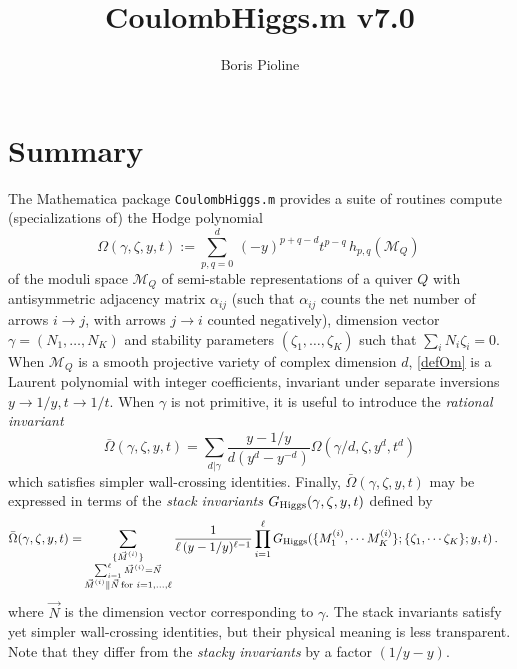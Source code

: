 \documentclass[12pt]{JHEP3}
\title{CoulombHiggs.m v7.0}
\author{Boris Pioline}
\newcommand{\be}{\begin{equation}}
\newcommand{\ee}{\end{equation}}
\newcommand\bOm{\bar\Omega}
\newcommand{\cM}{\mathcal{M}}
\newcommand{\gR}{G_{\rm Higgs}}
\begin{document}
\maketitle

\baselineskip 15pt

\tableofcontents

\medskip

\section{Summary}

The  {\sc Mathematica} package {\tt CoulombHiggs.m} provides a suite of routines compute (specializations of) the Hodge polynomial 
\be
\label{defOm}
\Omega(\gamma,\zeta,y,t) := 
\sum_{p,q=0}^{d}\, (-y)^{p+q-d} t^{p-q}\, h_{p,q}(\cM_Q)\, 
\ee
of the moduli space $\cM_Q$ of semi-stable representations of a quiver $Q$ with antisymmetric
adjacency matrix $\alpha_{ij}$ (such that $\alpha_{ij}$ counts the net number of arrows $i\to j$, with
arrows $j\to i$ counted negatively),  dimension vector $\gamma=(N_1,\dots, N_K)$ and stability parameters $(\zeta_1,\dots, \zeta_K)$ such that $\sum_i N_i \zeta_i=0$. When $\cM_Q$ is 
a smooth projective variety of complex dimension $d$, \eqref{defOm} is a Laurent polynomial  with integer coefficients, invariant under separate inversions $y\to 1/y, t\to 1/t$. When $\gamma$ is not primitive, it is useful to introduce the {\it rational invariant}
\be
\label{defbOm}
\bOm(\gamma,\zeta,y,t)=\sum_{d|\gamma} \frac{y-1/y}{d(y^d-y^{-d})} \Omega(\gamma/d,\zeta,y^d,t^d)\ee 
which satisfies simpler wall-crossing identities. Finally, $\bOm(\gamma,\zeta,y,t)$ may be expressed 
in terms of the {\it stack invariants} $G_{\rm Higgs}(\gamma,\zeta,y,t)$ defined by \cite[(4.1)]{Manschot:2013sya}
\be
\label{eq:inversestackinv}
\begin{split}
\bOm(\gamma,\zeta,y,t) 
  =& %
  \sum_{\substack{\{\vec M^{(i)}\} \\
  \sum_{i=1}^\ell \vec M^{(i)}=\vec N \\  \vec M^{(i)}\parallel \vec N
  \,\mathrm{for}\,\, i=1,\dots,\ell}}
\frac{1}{\ell\,(y-1/y)^{\ell-1}}  
\prod_{i=1}^\ell 
\gR(\{ M^{(i)}_1, \cdots M^{(i)}_K \};
\{\zeta_1, \cdots \zeta_K\};y,t)
\, .  
\end{split}
\ee
where $\vec N$ is the dimension vector corresponding to $\gamma$. The stack invariants 
satisfy yet simpler wall-crossing identities, but their physical meaning is less transparent.
Note that they differ from the {\it stacky invariants} by a factor $(1/y-y)$.
\end{document}
